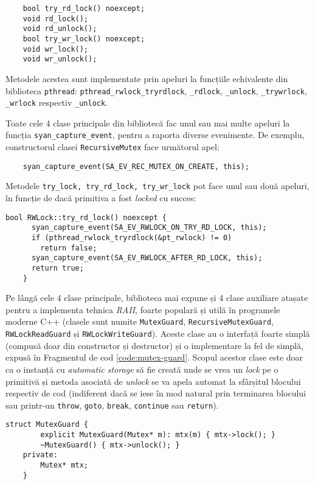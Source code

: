 \begin{lstlisting}
    bool try_rd_lock() noexcept;
    void rd_lock();
    void rd_unlock();
    bool try_wr_lock() noexcept;
    void wr_lock();
    void wr_unlock();
\end{lstlisting}

Metodele acestea sunt implementate prin apeluri la funcțiile
echivalente din biblioteca \lstinline{pthread}:
\lstinline{pthread_rwlock_tryrdlock}, \lstinline{_rdlock},
\lstinline{_unlock}, \lstinline{_trywrlock}, \lstinline{_wrlock}
respectiv \lstinline{_unlock}.

Toate cele 4 clase principale din bibliotecă fac unul sau mai multe
apeluri la funcția \lstinline{syan_capture_event}, pentru a raporta
diverse evenimente. De exemplu, constructorul clasei
\lstinline{RecursiveMutex} face următorul apel:
\begin{lstlisting}
    syan_capture_event(SA_EV_REC_MUTEX_ON_CREATE, this);
\end{lstlisting}
Metodele \lstinline{try_lock, try_rd_lock, try_wr_lock} pot face unul
sau două apeluri, în funcție de dacă primitiva a fost \textit{locked} cu
succes:
\begin{lstlisting}[caption=Metoda \lstinline{RWLock::try_rd_lock} din
                           \lstinline{cxxsync}]
    bool RWLock::try_rd_lock() noexcept {
      syan_capture_event(SA_EV_RWLOCK_ON_TRY_RD_LOCK, this);
      if (pthread_rwlock_tryrdlock(&pt_rwlock) != 0)
        return false;
      syan_capture_event(SA_EV_RWLOCK_AFTER_RD_LOCK, this);
      return true;
    }
\end{lstlisting}

Pe lângă cele 4 clase principale, biblioteca mai expune și 4 clase
auxiliare atașate pentru a implementa tehnica \textit{RAII}\cite{RAII},
foarte populară și utilă în programele moderne C++ (clasele sunt numite
\lstinline{MutexGuard}, \lstinline{RecursiveMutexGuard},
\lstinline{RWLockReadGuard} și \lstinline{RWLockWriteGuard}). Aceste
clase au o interfață foarte simplă (compusă doar din constructor și
destructor) și o implementare la fel de simplă, expusă în Fragmentul de
cod \ref{code:mutex-guard}. Scopul acestor clase este doar ca o instanță
cu \textit{automatic storage} să fie creată unde se vrea un
\textit{lock} pe o primitivă și metoda asociată de \textit{unlock} se va
apela automat la sfârșitul blocului respectiv de cod (indiferent dacă se
iese în mod natural prin terminarea blocului sau printr-un
\lstinline{throw}, \lstinline{goto}, \lstinline{break},
\lstinline{continue} sau \lstinline{return}).
\begin{lstlisting}[caption=Clasa \lstinline{MutexGuard} din
                           \lstinline{cxxsync},
                   label=code:mutex-guard]
    struct MutexGuard {
        explicit MutexGuard(Mutex* m): mtx(m) { mtx->lock(); }
        ~MutexGuard() { mtx->unlock(); }
    private:
        Mutex* mtx;
    }
\end{lstlisting}

